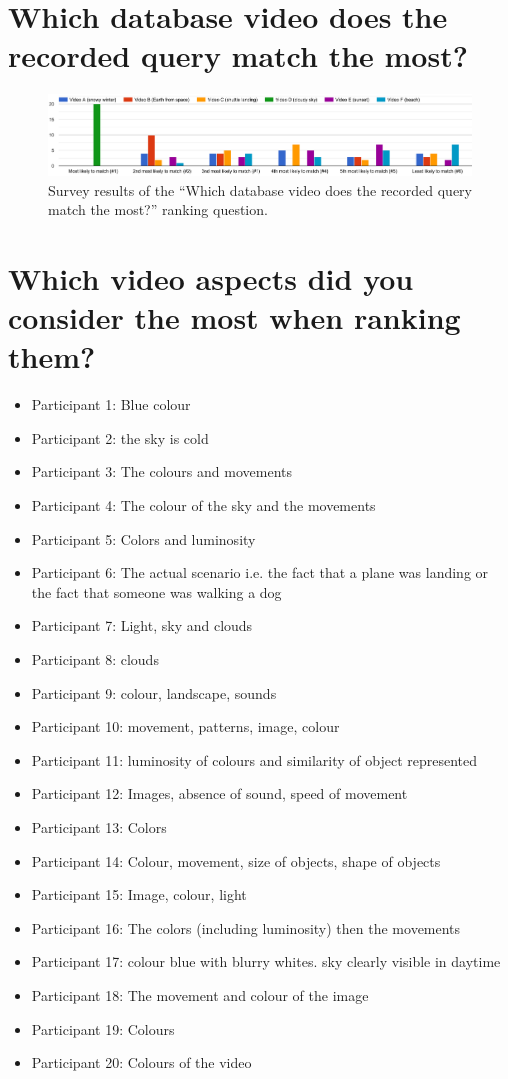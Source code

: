 \section{Which database video does the recorded query match the most?}

\begin{figure}[h] 
\centerline{\includegraphics[width=\textwidth]{figures/appendix/survey_results.png}}
\caption{\label{fig:appendix_survey_results}Survey results of the ``Which database video does the recorded query match the most?'' ranking question.}
\end{figure}

\section{Which video aspects did you consider the most when ranking them?}

\begin{itemize}
	\item Participant 1: Blue colour
    \item Participant 2: the sky is cold
    \item Participant 3: The colours and movements
    \item Participant 4: The colour of the sky and the movements
    \item Participant 5: Colors and luminosity
    \item Participant 6: The actual scenario i.e. the fact that a plane was landing or the fact that someone was walking a dog
    \item Participant 7: Light, sky and clouds
    \item Participant 8: clouds
    \item Participant 9: colour, landscape, sounds
    \item Participant 10: movement, patterns, image, colour
    \item Participant 11: luminosity of colours and similarity of object represented
    \item Participant 12: Images, absence of sound, speed of movement
    \item Participant 13: Colors
    \item Participant 14: Colour, movement, size of objects, shape of objects
    \item Participant 15: Image, colour, light
    \item Participant 16: The colors (including luminosity) then the movements
    \item Participant 17: colour blue with blurry whites. sky clearly visible in daytime
    \item Participant 18: The movement and colour of the image
    \item Participant 19: Colours
    \item Participant 20: Colours of the video
\end{itemize}

